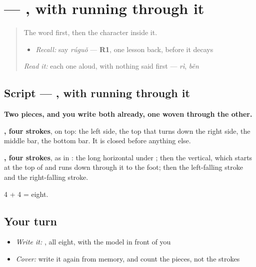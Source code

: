 \section[\texorpdfstring{\zh{果} (guǒ)}{果 (guǒ)}]{ — , with  running through it}

\label{lesson:ZH-W289-guo-fruit}



\begin{quote}
The word first, then the character inside it.

\begin{itemize}
\raggedright
  \item \emph{Recall:} say \emph{rúguǒ} — \textbf{R1}, one lesson back, before it decays
\end{itemize}

\begin{quote}
 
\end{quote}

\emph{Read it:} each one aloud, with nothing said first — \emph{rì}, \emph{běn}
\end{quote}

\subsection*{Script — , with  running through it}

\begin{quote}
\end{quote}

\textbf{Two pieces, and you write both already, one woven through the other.}

\textbf{, four strokes}, on top: the left side, the top that turns down the right side, the middle bar, the bottom bar. It is closed before anything else.

\textbf{, four strokes}, as in : the long horizontal under ; then the vertical, which starts at the top of  and runs down through it to the foot; then the left-falling stroke and the right-falling stroke.

4 + 4 = eight.

\subsection*{Your turn}
\begin{itemize}
\raggedright
  \item \emph{Write it:} , all eight, with the model in front of you
  \item \emph{Cover:} write it again from memory, and count the pieces, not the strokes
\end{itemize}

